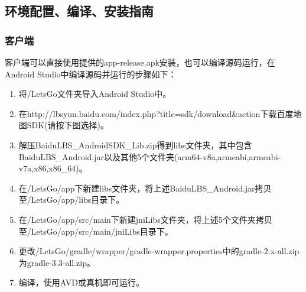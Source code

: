 \documentclass[UTF8]{article}
\begin{document}
\subsection{环境配置、编译、安装指南}
\subsubsection{客户端}
客户端可以直接使用提供的app-release.apk安装，也可以编译源码运行，在Android Studio中编译源码并运行的步骤如下：
\begin{enumerate}
    \item 将/LetsGo文件夹导入Android Studio中。
    \item 在http://lbsyun.baidu.com/index.php?title=sdk/download\&action下载百度地图SDK(请按下图选择)。
    \item 解压BaiduLBS\_AndroidSDK\_Lib.zip得到libs文件夹，其中包含BaiduLBS\_Android.jar以及其他5个文件夹(arm64-v8a,armeabi,armeabi-v7a,x86,x86\_64)。
    \item 在/LetsGo/app下新建libs文件夹，将上述BaiduLBS\_Android.jar拷贝至/LetsGo/app/libs目录下。
    \item 在/LetsGo/app/src/main下新建jniLibs文件夹，将上述5个文件夹拷贝至/LetsGo/app/src/main/jniLibs目录下。
    \item 更改/LetsGo/gradle/wrapper/gradle-wrapper.properties中的gradle-2.x-all.zip为gradle-3.3-all.zip。
    \item 编译，使用AVD或真机即可运行。
\end{enumerate}
\end{document}
